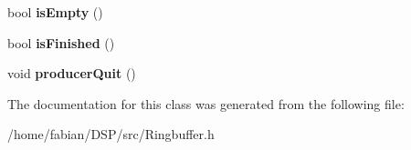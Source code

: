 \begin{DoxyCompactItemize}
\item 
\hypertarget{classRingbuffer_af746d95cfff3115957d01181484be191}{bool {\bfseries is\-Empty} ()}\label{classRingbuffer_af746d95cfff3115957d01181484be191}

\item 
\hypertarget{classRingbuffer_ac43a1bbfa6c41dd0aba33c70248425a6}{bool {\bfseries is\-Finished} ()}\label{classRingbuffer_ac43a1bbfa6c41dd0aba33c70248425a6}

\item 
\hypertarget{classRingbuffer_ae40e43d8729f0cfdcb97675cda52b05f}{void {\bfseries producer\-Quit} ()}\label{classRingbuffer_ae40e43d8729f0cfdcb97675cda52b05f}

\end{DoxyCompactItemize}


The documentation for this class was generated from the following file\-:\begin{DoxyCompactItemize}
\item 
/home/fabian/\-D\-S\-P/src/Ringbuffer.\-h\end{DoxyCompactItemize}

